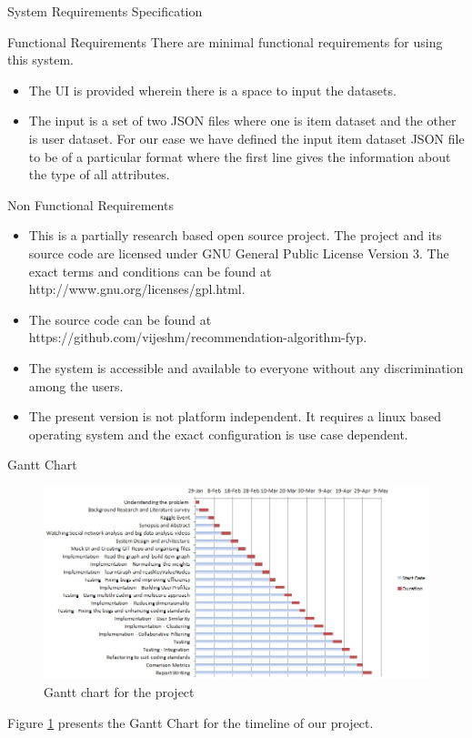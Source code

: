 \documentclass{report}
\begin{document}
\begin{projChapter}{System Requirements Specification}
\begin{projSection}{Functional Requirements}
            There are minimal functional requirements for using this system.
            
\begin{itemize}
  \item  The UI is provided wherein there is a space to input the datasets.
  \item  The input is a set of two JSON files where one is item dataset and the other is user dataset. For our ease we have defined the input item dataset JSON file to be of a particular format where the first line gives the information about the type of all attributes.
\end{itemize}

\end{projSection}
\begin{projSection}{Non Functional Requirements}

\begin{itemize}
  \item This is a partially research based open source project. The project and its source code are licensed under GNU General Public License Version 3. The exact terms and conditions can be found at http://www.gnu.org/licenses/gpl.html.
  \item The source code can be found at ~\\https://github.com/vijeshm/recommendation-algorithm-fyp.
  \item The system is accessible and available to everyone without any discrimination among the users.
  \item The present version is not platform independent. It requires a linux based operating system and the exact configuration is use case dependent.
\end{itemize}

\end{projSection}
\end{projChapter}

\begin{projChapter}{Gantt Chart}
\begin{figure}[ht!]
\centering
\includegraphics[scale=0.75]{images/gantt.png}
\caption{Gantt chart for the project}
\label{gantt}
\end{figure}

Figure \ref{gantt} presents the Gantt Chart for the timeline of our project.
    \end{projChapter}
\end{document}
